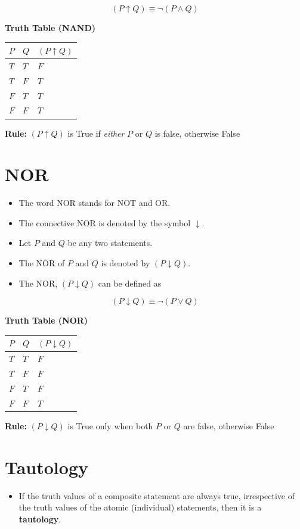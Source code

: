 \documentclass[]{book}
\providecommand{\tightlist}{%
  \setlength{\itemsep}{0pt}\setlength{\parskip}{0pt}}
\begin{document}
\[(P\uparrow Q)\equiv\lnot(P \land Q)\]

\textbf{Truth Table (NAND)}

\begin{longtable}[]{@{}lll@{}}
\toprule
\(P\) & \(Q\) & \((P \uparrow Q)\)\tabularnewline
\midrule
\endhead
\(T\) & \(T\) & \(F\)\tabularnewline
\(T\) & \(F\) & \(T\)\tabularnewline
\(F\) & \(T\) & \(T\)\tabularnewline
\(F\) & \(F\) & \(T\)\tabularnewline
\bottomrule
\end{longtable}

\textbf{Rule:} \((P \uparrow Q)\) is True if \emph{either} \(P\) or \(Q\) is false, otherwise False

\hypertarget{nor}{%
\section{NOR}\label{nor}}

\begin{itemize}
\tightlist
\item
  The word NOR stands for NOT and OR.
\item
  The connective NOR is denoted by the symbol \(\downarrow\).
\item
  Let \(P\) and \(Q\) be any two statements.
\item
  The NOR of \(P\) and \(Q\) is denoted by \((P \downarrow Q)\).
\item
  The NOR, \((P \downarrow Q)\) can be defined as
\end{itemize}

\[(P\downarrow Q)\equiv\lnot(P \lor Q)\]

\textbf{Truth Table (NOR)}

\begin{longtable}[]{@{}lll@{}}
\toprule
\(P\) & \(Q\) & \((P \downarrow Q)\)\tabularnewline
\midrule
\endhead
\(T\) & \(T\) & \(F\)\tabularnewline
\(T\) & \(F\) & \(F\)\tabularnewline
\(F\) & \(T\) & \(F\)\tabularnewline
\(F\) & \(F\) & \(T\)\tabularnewline
\bottomrule
\end{longtable}

\textbf{Rule:} \((P \downarrow Q)\) is True only when both \(P\) or \(Q\) are false, otherwise False

\hypertarget{tautology}{%
\section{Tautology}\label{tautology}}

\begin{itemize}
\tightlist
\item
  If the truth values of a composite statement are always true, irrespective of the truth values of the atomic (individual) statements, then it is a \textbf{tautology}.
\end{itemize}
\end{document}
